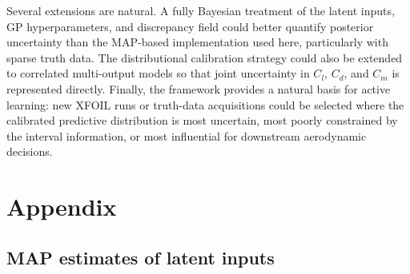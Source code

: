 \documentclass[journal]{new-aiaa}
\begin{document}
Several extensions are natural. A fully Bayesian treatment of the latent inputs, GP hyperparameters, and discrepancy field could better quantify posterior uncertainty than the MAP-based implementation used here, particularly with sparse truth data. The distributional calibration strategy could also be extended to correlated multi-output models so that joint uncertainty in $C_l$, $C_d$, and $C_m$ is represented directly. Finally, the framework provides a natural basis for active learning: new XFOIL runs or truth-data acquisitions could be selected where the calibrated predictive distribution is most uncertain, most poorly constrained by the interval information, or most influential for downstream aerodynamic decisions.


\section*{Appendix}

\subsection*{MAP estimates of latent inputs}
\end{document}
